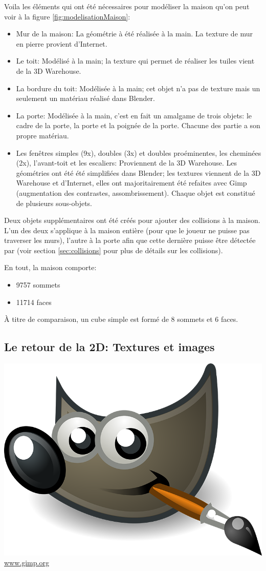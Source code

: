 Voila les éléments qui ont été nécessaires pour modéliser la maison qu'on peut voir à la figure \ref{fig:modelisationMaison}:
\begin{itemize}
	\item Mur de la maison: La géométrie à été réalisée à la main. La texture de mur en pierre provient d'Internet.
	\item Le toit: Modélisé à la main; la texture qui permet de réaliser les tuiles vient de la 3D Warehouse.
	\item La bordure du toit: Modélisée à la main; cet objet n'a pas de texture mais un seulement un matériau réalisé dans Blender.
	\item La porte: Modélisée à la main, c'est en fait un amalgame de trois objets: le cadre de la porte, la porte et la poignée de la porte. Chacune des partie a son propre matériau.
	\item Les fenêtres simples (9x), doubles (3x) et doubles proéminentes, les cheminées (2x), l'avant-toit et les escaliers: Proviennent de la 3D Warehouse. Les géométries ont été été simplifiées dans Blender; les textures viennent de la 3D Warehouse et d'Internet, elles ont majoritairement été refaites avec Gimp (augmentation des contrastes, assombrissement). Chaque objet est constitué de plusieurs sous-objets.
\end{itemize}

Deux objets supplémentaires ont été créés pour ajouter des collisions à la maison. L'un des deux s'applique à la maison entière (pour que le joueur ne puisse pas traverser les murs), l'autre à la porte afin que cette dernière puisse être détectée par  (voir section \ref{sec:collisions} pour plus de détails sur les collisions).

En tout, la maison comporte:
\begin{itemize}
	\item 9757 sommets
	\item 11714 faces
\end{itemize}
À titre de comparaison, un cube simple est formé de 8 sommets et 6 faces.


\subsection{Le retour de la 2D: Textures et images}
\begin{center}
	\includegraphics[width=.2\textwidth]{images/Technique/gimp.png}
	\\\url{www.gimp.org}
\end{center}

